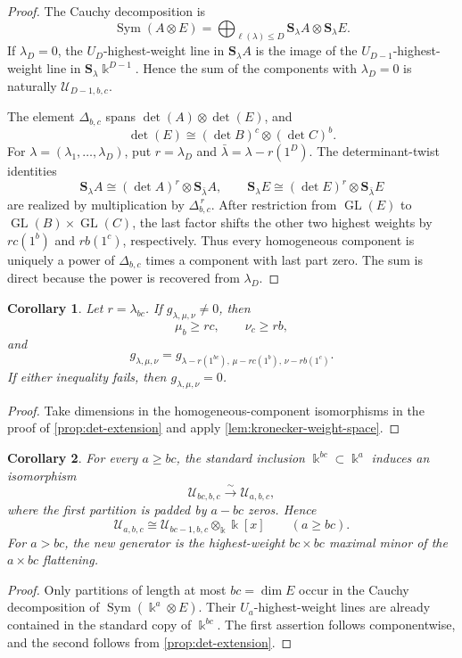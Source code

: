 \documentclass[11pt,reqno]{amsart}
\numberwithin{equation}{section}
\newtheorem{corollary}[corollary]{Corollary}
\theoremstyle{remark}
\newcommand{\kk}{\Bbbk}
\newcommand{\UR}{\mathscr U}
\newcommand{\Sym}{\operatorname{Sym}}
\newcommand{\GL}{\operatorname{GL}}
\newcommand{\Schur}{\mathbf{S}}
\begin{document}
\begin{proof}
The Cauchy decomposition is
\[ \Sym(A\otimes E) =\bigoplus_{\ell(\lambda)\le D} \Schur_\lambda A\otimes\Schur_\lambda E. \]
If $\lambda_D=0$, the $U_D$-highest-weight line in
$\Schur_\lambda A$ is the image of the $U_{D-1}$-highest-weight line in
$\Schur_\lambda\kk^{D-1}$.  Hence the sum of the components with
$\lambda_D=0$ is naturally $\UR_{D-1,b,c}$.

The element $\Delta_{b,c}$ spans $\det(A)\otimes\det(E)$, and
\[ \det(E)\cong(\det B)^c\otimes(\det C)^b. \]
For $\lambda=(\lambda_1,\ldots,\lambda_D)$, put $r=\lambda_D$ and
$\bar\lambda=\lambda-r(1^D)$.  The determinant-twist identities
\[ \Schur_\lambda A\cong(\det A)^r\otimes\Schur_{\bar\lambda}A, \qquad \Schur_\lambda E\cong(\det E)^r\otimes\Schur_{\bar\lambda}E \]
are realized by multiplication by $\Delta_{b,c}^{\,r}$.  After
restriction from $\GL(E)$ to $\GL(B)\times\GL(C)$, the last factor shifts
the other two highest weights by $rc(1^b)$ and $rb(1^c)$, respectively.
Thus every homogeneous component is uniquely a power of $\Delta_{b,c}$
times a component with last part zero.  The sum is direct because the power
is recovered from $\lambda_D$.
\end{proof}

\begin{corollary}
\label{cor:rectangular-translation}
Let $r=\lambda_{bc}$.  If $g_{\lambda,\mu,\nu}\ne0$, then
\[ \mu_b\ge rc,\qquad \nu_c\ge rb, \]
and
\[ g_{\lambda,\mu,\nu} =g_{\lambda-r(1^{bc}),\,\mu-rc(1^b),\,\nu-rb(1^c)}. \]
If either inequality fails, then $g_{\lambda,\mu,\nu}=0$.
\end{corollary}

\begin{proof}
Take dimensions in the homogeneous-component isomorphisms in the proof of
\cref{prop:det-extension} and apply \cref{lem:kronecker-weight-space}.
\end{proof}

\begin{corollary}
\label{cor:stable-first-factor}
For every $a\ge bc$, the standard inclusion $\kk^{bc}\subset\kk^a$
induces an isomorphism
\[ \UR_{bc,b,c}\xrightarrow{\sim}\UR_{a,b,c}, \]
where the first partition is padded by $a-bc$ zeros.  Hence
\[ \UR_{a,b,c}\cong\UR_{bc-1,b,c}\otimes_\kk\kk[x] \qquad(a\ge bc). \]
For $a>bc$, the new generator is the highest-weight $bc\times bc$
maximal minor of the $a\times bc$ flattening.
\end{corollary}

\begin{proof}
Only partitions of length at most $bc=\dim E$ occur in the Cauchy
decomposition of $\Sym(\kk^a\otimes E)$.  Their $U_a$-highest-weight
lines are already contained in the standard copy of $\kk^{bc}$.  The first
assertion follows componentwise, and the second follows from
\cref{prop:det-extension}.
\end{proof}
\end{document}

